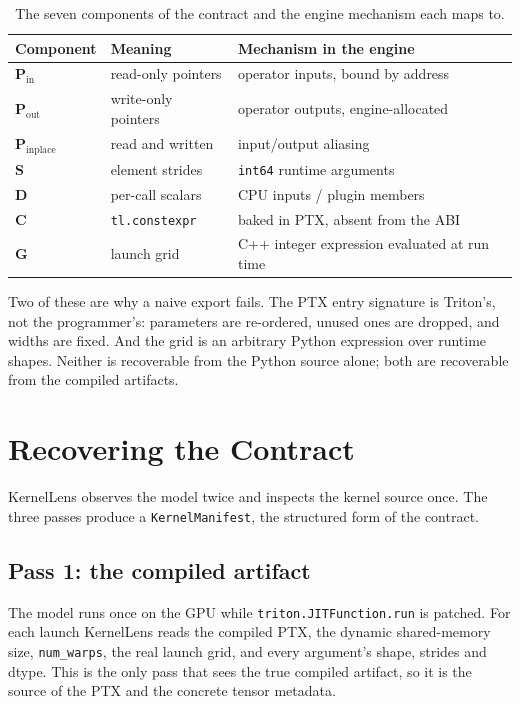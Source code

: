 \documentclass{article}
\begin{document}
\begin{table}[t]
\centering
\small
\begin{tabularx}{\textwidth}{l l X}
\toprule
\textbf{Component} & \textbf{Meaning} & \textbf{Mechanism in the engine} \\ \midrule
$\mathbf{P}_{\text{in}}$ & read-only pointers & operator inputs, bound by address \\
$\mathbf{P}_{\text{out}}$ & write-only pointers & operator outputs, engine-allocated \\
$\mathbf{P}_{\text{inplace}}$ & read and written & input/output aliasing \\
$\mathbf{S}$ & element strides & \texttt{int64} runtime arguments \\
$\mathbf{D}$ & per-call scalars & CPU inputs / plugin members \\
$\mathbf{C}$ & \texttt{tl.constexpr} & baked in PTX, absent from the ABI \\
$\mathbf{G}$ & launch grid & C++ integer expression evaluated at run time \\
\bottomrule
\end{tabularx}
\caption{The seven components of the contract and the engine mechanism each maps to.}
\label{tab:contract}
\end{table}

Two of these are why a naive export fails. The PTX entry signature is Triton's,
not the programmer's: parameters are re-ordered, unused ones are dropped, and
widths are fixed. And the grid is an arbitrary Python expression over runtime
shapes. Neither is recoverable from the Python source alone; both are recoverable
from the compiled artifacts.

\section{Recovering the Contract}
\label{sec:recover}

KernelLens observes the model twice and inspects the kernel source once. The
three passes produce a \texttt{KernelManifest}, the structured form of the
contract.

\subsection{Pass 1: the compiled artifact}

The model runs once on the GPU while \texttt{triton.JITFunction.run} is patched.
For each launch KernelLens reads the compiled PTX, the dynamic shared-memory
size, \texttt{num\_warps}, the real launch grid, and every argument's shape,
strides and dtype. This is the only pass that sees the true compiled artifact, so
it is the source of the PTX and the concrete tensor metadata.
\end{document}
